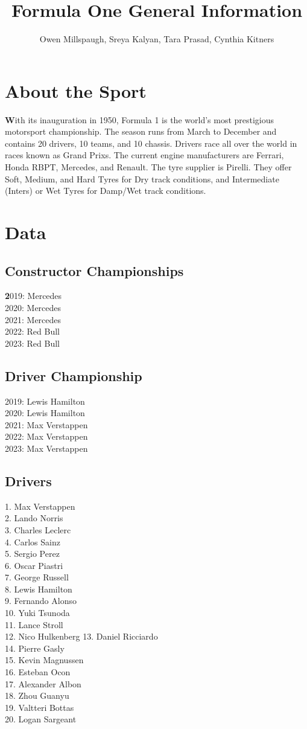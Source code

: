 \documentclass[12pt]{article}
\title{Formula One General Information}
\author{Owen Millspaugh, Sreya Kalyan, Tara Prasad, Cynthia Kitners}
\begin{document}
\maketitle

\section{About the Sport}
\textbf With its inauguration in 1950, Formula 1 is the world's most prestigious motorsport championship. 
The season runs from March to December and contains 20 drivers, 10 teams, and 10 chassis.
Drivers race all over the world in races known as Grand Prixs.
The current engine manufacturers are Ferrari, Honda RBPT, Mercedes, and Renault. 
The tyre supplier is Pirelli. They offer Soft, Medium, and Hard Tyres for Dry track conditions, 
and Intermediate (Inters) or Wet Tyres for Damp/Wet track conditions. 
\section{Data}
\subsection{Constructor Championships}
\textbf 2019: Mercedes\\
2020: Mercedes\\
2021: Mercedes\\
2022: Red Bull\\
2023: Red Bull
\subsection{Driver Championship}
2019: Lewis Hamilton\\
2020: Lewis Hamilton\\
2021: Max Verstappen\\
2022: Max Verstappen\\
2023: Max Verstappen
\subsection{Drivers}
1. Max Verstappen\\
2. Lando Norris\\
3. Charles Leclerc\\
4. Carlos Sainz\\
5. Sergio Perez\\
6. Oscar Piastri\\
7. George Russell\\
8. Lewis Hamilton\\
9. Fernando Alonso\\
10. Yuki Tsunoda\\
11. Lance Stroll\\
12. Nico Hulkenberg
13. Daniel Ricciardo\\
14. Pierre Gasly\\
15. Kevin Magnussen\\
16. Esteban Ocon\\
17. Alexander Albon\\
18. Zhou Guanyu\\
19. Valtteri Bottas\\
20. Logan Sargeant
\end{document}
